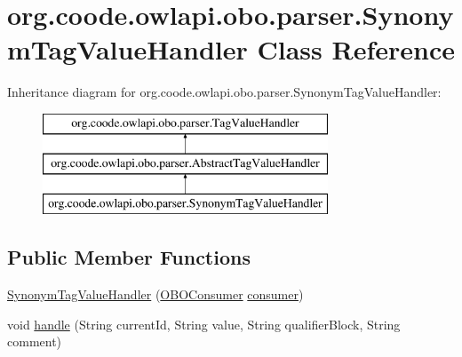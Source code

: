 \hypertarget{classorg_1_1coode_1_1owlapi_1_1obo_1_1parser_1_1_synonym_tag_value_handler}{\section{org.\-coode.\-owlapi.\-obo.\-parser.\-Synonym\-Tag\-Value\-Handler Class Reference}
\label{classorg_1_1coode_1_1owlapi_1_1obo_1_1parser_1_1_synonym_tag_value_handler}
}
Inheritance diagram for org.\-coode.\-owlapi.\-obo.\-parser.\-Synonym\-Tag\-Value\-Handler\-:\begin{figure}[H]
\begin{center}
\leavevmode
\includegraphics[height=3.000000cm]{classorg_1_1coode_1_1owlapi_1_1obo_1_1parser_1_1_synonym_tag_value_handler}
\end{center}
\end{figure}
\subsection*{Public Member Functions}
\begin{DoxyCompactItemize}
\item 
\hyperlink{classorg_1_1coode_1_1owlapi_1_1obo_1_1parser_1_1_synonym_tag_value_handler_a183631b8759024d5cb2558d9d12644c0}{Synonym\-Tag\-Value\-Handler} (\hyperlink{classorg_1_1coode_1_1owlapi_1_1obo_1_1parser_1_1_o_b_o_consumer}{O\-B\-O\-Consumer} \hyperlink{classorg_1_1coode_1_1owlapi_1_1obo_1_1parser_1_1_abstract_tag_value_handler_ab27f1ff22d15640c5f81585f18265137}{consumer})
\item 
void \hyperlink{classorg_1_1coode_1_1owlapi_1_1obo_1_1parser_1_1_synonym_tag_value_handler_a739d01f16460d14388d1826d45a20a43}{handle} (String current\-Id, String value, String qualifier\-Block, String comment)
\end{DoxyCompactItemize}
